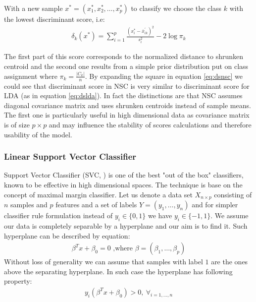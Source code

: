 \documentclass[12pt, wide]{mwart}
\begin{document}
With a new sample $x^{*}=\left(x_{1}^{*}, x_{2}^{*}, \ldots, x_{p}^{*}\right)$ to classify we choose the class $k$ with the lowest discriminant score, i.e:
\begin{align}
\delta_{k}\left(x^{*}\right)=\sum_{i=1}^{p}\frac{\left(x_{i}^{*}-\overline{x}_{ik}^{\prime}\right)^{2}}{s_{i}^{2}}-2 \log \pi_{k} \label{eq:dsnsc}
\end{align}

The first part of this score corresponds to the normalized distance to shrunken centroid and the second one results from a simple prior distribution put on class assignment where $\pi_{k} = \frac{|C_k|}{n}$. By expanding the square in equation \ref{eq:dsnsc} we could see that discriminant score in NSC is very similar to discriminant score for LDA (as in equation \ref{eq:dslda}). In fact the distinctions are that NSC assumes diagonal covariance matrix and uses shrunken centroids instead of sample means. The first one is particularly useful in high dimensional data as covariance matrix is of size $p \times p$ and may influence the stability of scores calculations and therefore usability of the model.

\subsubsection{Linear Support Vector Classifier}

Support Vector Classifier (SVC, \cite[chapter 9]{ISL}) is one of the best "out of the box" classifiers, known to be effective in high dimensional spaces. The technique is base on the concept of maximal margin classifier. Let us denote a data set $X_{n \times p}$ consisting of $n$ samples and $p$ features and a set of labels $Y = (y_1, \ldots, y_n)$ and for simpler classifier rule formulation instead of $y_i \in \{0,1\}$ we have $y_i \in \{-1, 1\}$. We assume our data is completely separable by a hyperplane and our aim is to find it. Such hyperplane can be described by equation:
\begin{align*}
    \beta^T x + \beta_0 = 0 \text{ ,where $\beta = (\beta_1, \ldots, \beta_p)$}
\end{align*}
Without loss of generality we can assume that samples with label $1$ are the ones above the separating hyperplane. In such case the hyperplane has following property:
\begin{align*}
    y_i(\beta^T x + \beta_0) > 0, \ \forall_{i=1, \ldots, n}
\end{align*}
\end{document}
